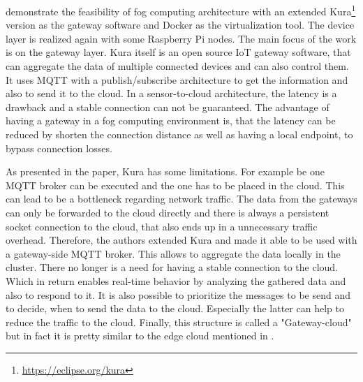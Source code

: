 \autocite{Bellavista:2017} demonstrate the feasibility of fog computing architecture with an extended Kura\footnote{\url{https://eclipse.org/kura}} version as the gateway software and Docker as the virtualization tool.
The device layer is realized again with some Raspberry Pi nodes.
The main focus of the work is on the gateway layer.
Kura itself is an open source \ac{IoT} gateway software, that can aggregate the data of multiple connected devices and can also control them.\autocite[cf.][p. 2]{Bellavista:2017}
It uses \ac{MQTT} with a publish/subscribe architecture to get the information and also to send it to the cloud.\autocite[cf.][p. 2]{Bellavista:2017}
In a sensor-to-cloud architecture, the latency is a drawback and a stable connection can not be guaranteed.\autocite[cf.][p. 1]{Bellavista:2017}
The advantage of having a gateway in a fog computing environment is, that the latency can be reduced by shorten the connection distance as well as having a local endpoint, to bypass connection losses.\autocite[cf.][p. 1]{Bellavista:2017}

As presented in the paper, Kura has some limitations.
For example be one \ac{MQTT} broker can be executed and the one has to be placed in the cloud.\autocite[cf.][p. 3]{Bellavista:2017}
This can lead to be a bottleneck regarding network traffic.
The data from the gateways can only be forwarded to the cloud directly and there is always a persistent socket connection to the cloud, that also ends up in a unnecessary traffic overhead.\autocite[cf.][p. 3]{Bellavista:2017}
Therefore, the authors extended Kura and made it able to be used with a gateway-side \ac{MQTT} broker.
This allows to aggregate the data locally in the cluster.\autocite[cf.][p. 3]{Bellavista:2017}
There no longer is a need for having a stable connection to the cloud.
Which in return enables real-time behavior by analyzing the gathered data and also to respond to it.\autocite[cf.][p. 3]{Bellavista:2017}
It is also possible to prioritize the messages to be send and to decide, when to send the data to the cloud.\autocite[cf.][p. 3]{Bellavista:2017}
Especially the latter can help to reduce the traffic to the cloud.
Finally, this structure is called a "Gateway-cloud" but in fact it is pretty similar to the edge cloud mentioned in \autocite{Pahl:2016}.

